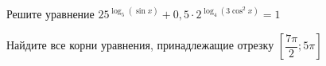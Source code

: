 \begin{ex}
	\begin{condition}
		\begin{enumcols}[label=\asbuk*)]
			\item Решите уравнение \( 25^{\log_5 {(\sin x)}} + 0,5\cdot2^{\log_4{(3\cos^2 x)}} =1 \)
			\item Найдите все корни уравнения, принадлежащие отрезку \( \left[\dfrac{7\pi}{2};5\pi\right] \)
		\end{enumcols}
	\end{condition}
\end{ex}